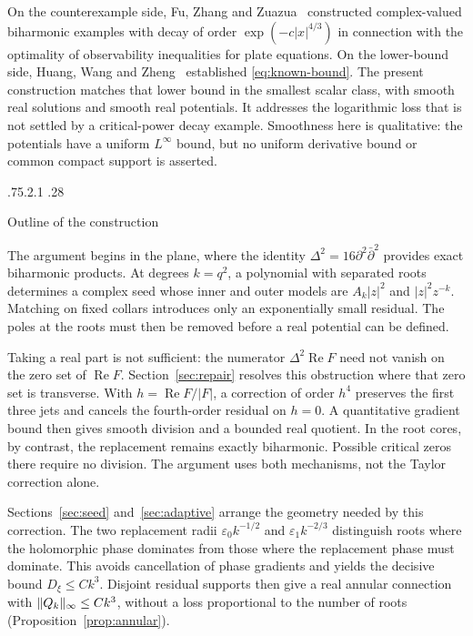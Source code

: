 \documentclass[11pt,a4paper,leqno]{amsart}
\makeatletter
\numberwithin{equation}{section}
\theoremstyle{landisplain}
\theoremstyle{landisdefinition}
\theoremstyle{landisremark}
\newcommand{\pa}{\partial}
\newcommand{\pb}{\bar\partial}
\newcommand{\eps}{\varepsilon}
\newcommand{\Rea}{\operatorname{Re}}
\DeclarePairedDelimiter{\norm}{\lVert}{\rVert}
\renewcommand\subsection{\@startsection{subsection}{2}{\z@}%
  {.75\baselineskip \@plus .2\baselineskip \@minus .1\baselineskip}%
  {.28\baselineskip}%
  {\normalfont\bfseries\raggedright}}
\makeatother
\begin{document}
On the counterexample side, Fu, Zhang and Zuazua~\cite{FZZ}
constructed complex-valued biharmonic examples with decay of
order $\exp(-c|x|^{4/3})$ in connection with the optimality
of observability inequalities for plate equations. On the
lower-bound side, Huang, Wang and Zheng~\cite{HWZ} established
\eqref{eq:known-bound}. The present construction matches that
lower bound in the smallest scalar class, with smooth real
solutions and smooth real potentials. It addresses the logarithmic
loss that is not settled by a critical-power decay example.
Smoothness here is qualitative: the potentials have a uniform
$L^\infty$ bound, but no uniform derivative bound or common
compact support is asserted.

\subsection{Outline of the construction}

The argument begins in the plane, where the identity
$\Delta^2=16\pa^2\pb^2$ provides exact biharmonic products.
At degrees $k=q^2$, a polynomial with separated roots determines
a complex seed whose inner and outer models are
$A_k|z|^2$ and $|z|^2z^{-k}$. Matching on fixed collars
introduces only an exponentially small residual. The poles at
the roots must then be removed before a real potential can be
defined.

Taking a real part is not sufficient: the numerator
$\Delta^2\Rea F$ need not vanish on the zero set of
$\Rea F$. Section~\ref{sec:repair} resolves this obstruction
where that zero set is transverse. With
$h=\Rea F/|F|$, a correction of order $h^4$ preserves the
first three jets and cancels the fourth-order residual on $h=0$.
A quantitative gradient bound then gives smooth division and a
bounded real quotient. In the root cores, by contrast, the
replacement remains exactly biharmonic. Possible critical zeros
there require no division. The argument uses both mechanisms,
not the Taylor correction alone.

Sections~\ref{sec:seed} and~\ref{sec:adaptive} arrange the
geometry needed by this correction. The two replacement radii
$\eps_0k^{-1/2}$ and $\eps_1k^{-2/3}$ distinguish roots
where the holomorphic phase dominates from those where the
replacement phase must dominate. This avoids cancellation of
phase gradients and yields the decisive bound $D_\xi\le Ck^3$.
Disjoint residual supports then give a real annular connection
with $\norm{Q_k}_\infty\le Ck^3$, without a loss proportional
to the number of roots
(Proposition~\ref{prop:annular}).
\end{document}
